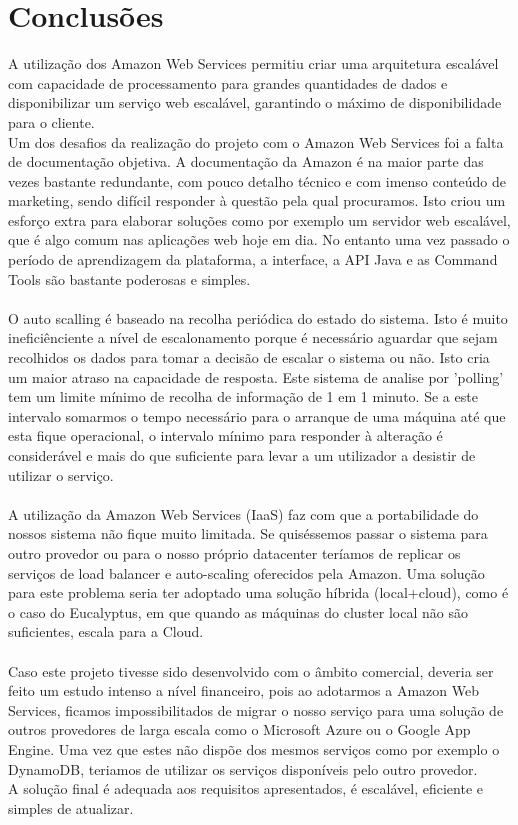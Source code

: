 
\chapter{Conclusões} 
\label{Chapter4} 

A utilização dos Amazon Web Services permitiu criar uma arquitetura escalável com capacidade de processamento para grandes quantidades de dados e disponibilizar um serviço web escalável, garantindo o máximo de disponibilidade para o cliente. \\
Um dos desafios da realização do projeto com o Amazon Web Services foi a falta de documentação objetiva. A documentação da Amazon é na maior parte das vezes bastante redundante, com pouco detalho técnico e com imenso conteúdo de marketing, sendo difícil responder à questão pela qual procuramos. Isto criou um esforço extra para elaborar soluções como por exemplo um servidor web escalável, que é algo comum nas aplicações web hoje em dia. No entanto uma vez passado o período de aprendizagem da plataforma, a interface, a API Java e as Command Tools são bastante poderosas e simples.\\
\\
O auto scalling é baseado na recolha periódica do estado do sistema. Isto é muito ineficiênciente a nível de escalonamento porque é necessário aguardar que sejam recolhidos os dados para tomar a decisão de escalar o sistema ou não. Isto cria um maior atraso na capacidade de resposta. Este sistema de analise por 'polling' tem um limite mínimo de recolha de informação de 1 em 1 minuto. Se a este intervalo somarmos o tempo necessário para o arranque de uma máquina até que esta fique operacional, o intervalo mínimo para responder à alteração é considerável e mais do que suficiente para levar a um utilizador a desistir de utilizar o serviço.\\
\\
A utilização da Amazon Web Services  (IaaS) faz com que a  portabilidade do nossos sistema não fique muito limitada. Se quiséssemos passar o sistema para outro provedor ou para o nosso próprio datacenter teríamos de replicar os serviços de load balancer e auto-scaling oferecidos pela Amazon. Uma solução para este problema seria ter adoptado uma solução híbrida (local+cloud), como é o caso do Eucalyptus, em que quando as máquinas do cluster local não são suficientes, escala para a Cloud. \\
\\
Caso este projeto tivesse sido desenvolvido com o âmbito comercial, deveria ser feito um estudo intenso a nível financeiro, pois ao adotarmos a Amazon Web Services, ficamos impossibilitados de migrar o nosso serviço para uma solução de outros provedores de larga escala como o Microsoft Azure ou o Google App Engine. Uma vez que estes não dispõe dos mesmos serviços como por exemplo o DynamoDB, teriamos de utilizar os serviços disponíveis pelo outro provedor.\\
A solução final é adequada aos requisitos apresentados, é escalável, eficiente e simples de atualizar.
